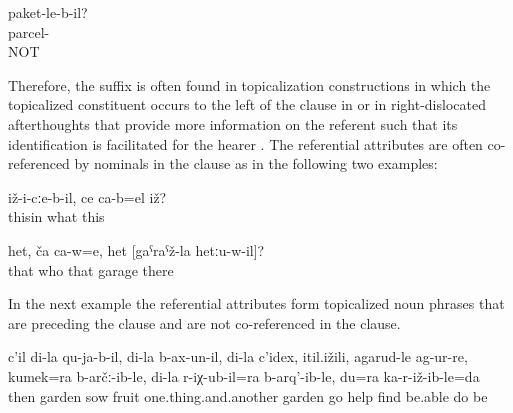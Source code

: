 \begin{exe}
	\ex	\label{ex:The (thing) in the parcel?}
	\gll	paket-le-b-il?\\
		parcel-\\
	\glt	{} NOT 
\end{exe}

Therefore, the suffix is often found in topicalization constructions in which the topicalized constituent occurs to the left of the clause in  or in right-dislocated afterthoughts that provide more information on the referent such that its identification is facilitated for the hearer . The referential attributes are often co-referenced by nominals in the clause as in the following two examples:

\begin{exe}
	\ex	\label{ex:‎This in it (i.e. his hand), what is it minor}
	\gll	iž-i-cːe-b-il,	ce	ca-b=el	iž?\\
		thisin	what		this\\
	\glt	{}
	
	\ex	\label{ex:He, who is it, the one of the garage there minor}
	\gll	het,	ča 	ca-w=e,	het	[gaˁraˁž-la	hetːu-w-il]?\\
		that	who		that	garage	there\\
	\glt	{}
	
\end{exe}

In the next example  the referential attributes form topicalized noun phrases that are preceding the clause and are not co-referenced in the clause.
%
\begin{exe}
	\ex	\label{ex:‎Then, for my fields, my sown fields, my fruits, all the stuff, I went to the garden, I found help}
	\gll	c'il	di-la	qu-ja-b-il,	di-la	b-ax-un-il,	di-la	c'idex,	itil.ižili,	agarud-le ag-ur-re, kumek=ra	b-arčː-ib-le,	di-la	r-iχ-ub-il=ra	b-arq'-ib-le,	du=ra	ka-r-iž-ib-le=da\\
		then		garden		sow		fruit		one.thing.and.another	garden	go\tsc{.pfv-pret-cvb}	help	find		be.able	do		be\\
	\glt	{}
\end{exe}
%

